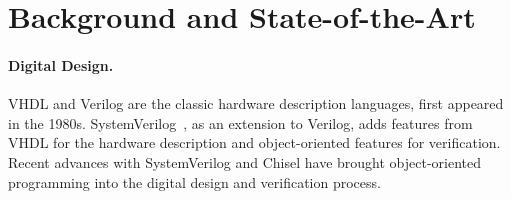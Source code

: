 \documentclass[fleqn,12pt]{article}
\begin{document}

\section{Background and State-of-the-Art}
\label{sec:background}



\paragraph{Digital Design.}
VHDL and Verilog are the classic hardware description languages, first appeared in the 1980s.
SystemVerilog~\cite{SystemVerilog}, as an extension to Verilog, adds features from VHDL
for the hardware description and object-oriented features for verification.
Recent advances with SystemVerilog and Chisel \cite{chisel:dac2012, chisel:book} have
brought object-oriented programming into the digital design and verification process.
\end{document}
